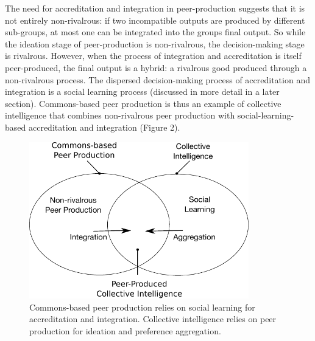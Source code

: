 The need for accreditation and integration in peer-production suggests that it is not entirely non-rivalrous: if two incompatible outputs are produced by different sub-groups, at most one can be integrated into the groups final output. So while the ideation stage of peer-production is non-rivalrous, the decision-making stage is rivalrous. However, when the process of integration and accreditation is itself peer-produced, the final output is a hybrid: a rivalrous good produced through a non-rivalrous process. The dispersed decision-making process of accreditation and integration is a social learning process (discussed in more detail in a later section). Commons-based peer production is thus an example of collective intelligence that combines non-rivalrous peer production with social-learning-based accreditation and integration (Figure 2).

\begin{figure}
\centering
\includegraphics[width=3.75in]{images/fig-peer-intelligence.pdf}
\caption{
Commons-based peer production relies on social learning for
accreditation and integration. Collective intelligence relies on peer
production for ideation and preference aggregation.\label{fig:peer-intelligence}
}
\end{figure}

